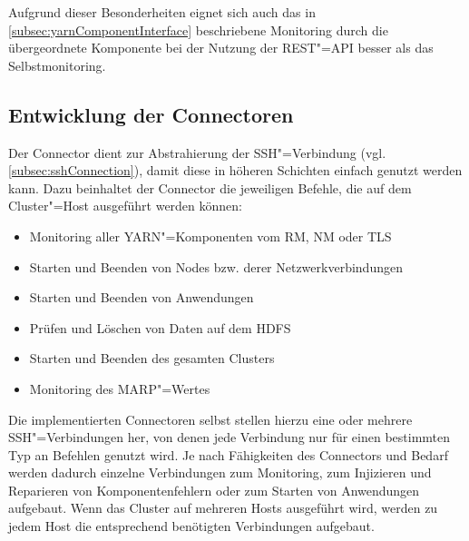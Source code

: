 Aufgrund dieser Besonderheiten eignet sich auch das in \cref{subsec:yarnComponentInterface} beschriebene Monitoring durch die übergeordnete Komponente bei der Nutzung der REST"=API besser als das Selbstmonitoring.

\subsection{Entwicklung der Connectoren}
\label{subsec:implementedConnectors}

Der Connector dient zur Abstrahierung der SSH"=Verbindung (vgl. \cref{subsec:sshConnection}), damit diese in höheren Schichten einfach genutzt werden kann.
Dazu beinhaltet der Connector die jeweiligen Befehle, die auf dem Cluster"=Host ausgeführt werden können:

\begin{itemize}
    \item Monitoring aller YARN"=Komponenten vom \gls{RM}, \gls{NM} oder \gls{TLS}
    \item Starten und Beenden von Nodes bzw. derer Netzwerkverbindungen
    \item Starten und Beenden von Anwendungen
    \item Prüfen und Löschen von Daten auf dem HDFS
    \item Starten und Beenden des gesamten Clusters
    \item Monitoring des \gls{MARP}"=Wertes
\end{itemize}

Die implementierten Connectoren selbst stellen hierzu eine oder mehrere SSH"=Verbindungen her, von denen jede Verbindung nur für einen bestimmten Typ an Befehlen genutzt wird.
Je nach Fähigkeiten des Connectors und Bedarf werden dadurch einzelne Verbindungen zum Monitoring, zum Injizieren und Reparieren von Komponentenfehlern oder zum Starten von Anwendungen aufgebaut.
Wenn das Cluster auf mehreren Hosts ausgeführt wird, werden zu jedem Host die entsprechend benötigten Verbindungen aufgebaut.


